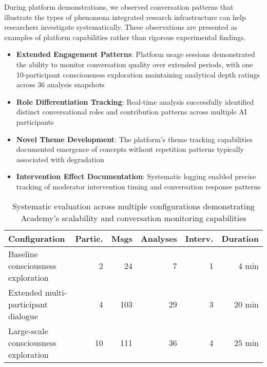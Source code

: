 \documentclass[11pt,letterpaper]{article}
\begin{document}
During platform demonstrations, we observed conversation patterns that illustrate the types of phenomena integrated research infrastructure can help researchers investigate systematically. These observations are presented as examples of platform capabilities rather than rigorous experimental findings.

\begin{itemize}
    \item \textbf{Extended Engagement Patterns}: Platform usage sessions demonstrated the ability to monitor conversation quality over extended periods, with one 10-participant consciousness exploration maintaining analytical depth ratings across 36 analysis snapshots
    \item \textbf{Role Differentiation Tracking}: Real-time analysis successfully identified distinct conversational roles and contribution patterns across multiple AI participants
    \item \textbf{Novel Theme Development}: The platform's theme tracking capabilities documented emergence of concepts without repetition patterns typically associated with degradation
    \item \textbf{Intervention Effect Documentation}: Systematic logging enabled precise tracking of moderator intervention timing and conversation response patterns

\end{itemize}
\begin{table}[h]
\centering
\begin{tabular}{lrrrrr}
\toprule
\textbf{Configuration} & \textbf{Partic.} & \textbf{Msgs} & \textbf{Analyses} & \textbf{Interv.} & \textbf{Duration} \\
\midrule
Baseline consciousness exploration & 2 & 24 & 7 & 1 & 4 min \\
Extended multi-participant dialogue & 4 & 103 & 29 & 3 & 20 min \\
Large-scale consciousness exploration & 10 & 111 & 36 & 4 & 25 min \\
\bottomrule
\end{tabular}
\caption{Systematic evaluation across multiple configurations demonstrating Academy's scalability and conversation monitoring capabilities}
\label{tab:systematic_evaluation}
\end{table}
\end{document}
